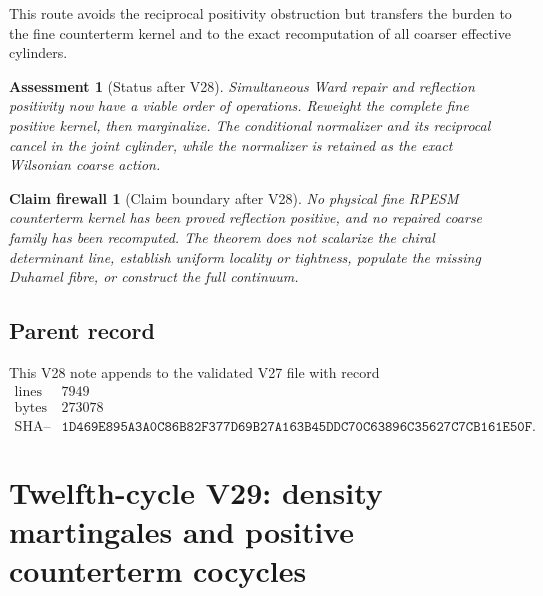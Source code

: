 \documentclass[11pt]{article}
\newtheorem{firewall}[theorem]{Claim firewall}
\newtheorem{assessment}[theorem]{Assessment}
\theoremstyle{remark}
\begin{document}
This route avoids the reciprocal positivity obstruction but transfers
the burden to the fine counterterm kernel and to the exact
recomputation of all coarser effective cylinders.

\begin{assessment}[Status after V28]
\label{ass:v12v28-status}
Simultaneous Ward repair and reflection positivity now have a viable
order of operations.  Reweight the complete fine positive kernel,
then marginalize.  The conditional normalizer and its reciprocal
cancel in the joint cylinder, while the normalizer is retained as
the exact Wilsonian coarse action.
\end{assessment}

\begin{firewall}[Claim boundary after V28]
\label{fire:v12v28-claim}
No physical fine RPESM counterterm kernel has been proved reflection
positive, and no repaired coarse family has been recomputed.  The
theorem does not scalarize the chiral determinant line, establish
uniform locality or tightness, populate the missing Duhamel fibre, or
construct the full continuum.
\end{firewall}

\subsection{Parent record}

This V28 note appends to the validated V27 file with record
\[
\begin{array}{c|c}
\text{lines}&7949\\
\text{bytes}&273078\\
\text{SHA--256}&
\texttt{1D469E895A3A0C86B82F377D69B27A163B45DDC70C63896C35627C7CB161E50F}.
\end{array}
\]


\section{Twelfth-cycle V29: density martingales and positive
counterterm cocycles}
\label{sec:v12v29}
\end{document}
